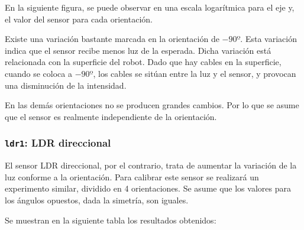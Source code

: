 \documentclass[10pt,a4paper,hidelinks,twocolumn]{article}
\begin{document}
En la siguiente figura, se puede observar en una escala logarítmica para el eje 
y, el valor del sensor para cada orientación.


Existe una variación bastante marcada en la orientación de $-90º$. Esta 
variación indica que el sensor recibe menos luz de la esperada. Dicha variación 
está relacionada con la superficie del robot. Dado que hay cables en la 
superficie, cuando se coloca a $-90º$, los cables se sitúan entre la luz y el 
sensor, y provocan una disminución de la intensidad.

En las demás orientaciones no se producen grandes cambios. Por lo que se asume 
que el sensor es realmente independiente de la orientación.
\subsubsection{\texttt{ldr1}: LDR direccional}
El sensor LDR direccional, por el contrario, trata de aumentar la variación de 
la luz conforme a la orientación. Para calibrar este sensor se realizará un 
experimento similar, dividido en 4 orientaciones. Se asume que los valores para 
los ángulos opuestos, dada la simetría, son iguales.

Se muestran en la siguiente tabla los resultados obtenidos:
\end{document}
